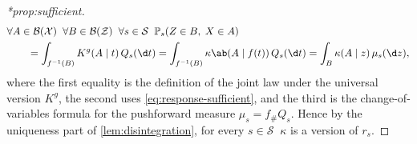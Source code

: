 \documentclass[12pt]{article}
\newcommand{\Prb}{\mathbb{P}}
\newcommand{\Gens}{\mathcal{S}}
\newcommand{\Borel}{\mathcal{B}}
\newcommand{\1}{\mathbbm{1}}
\newcommand{\pushf}[1]{#1_{\#}}
\renewcommand{\[}{\begin{equation}}
\renewcommand{\]}{\end{equation}}
\begin{document}
\begin{proof}[*prop:sufficient]
        \[
            \begin{split}
                &\forall A \in \Borel(\mathcal X) \;\; \forall B \in \Borel (\mathcal Z)\;\;\forall s \in \Gens \;\; \Prb_s(Z\in B,\; X\in A) \\
                &\qquad  = \int_{f^{-1}(B)} K^g(A \mid t)\,Q_s(\d t) = \int_{f^{-1}(B)} \kappa \ab(A\mid f(t)) \, Q_s(\d t) = \int_B \kappa( A \mid z)\,\mu_s(\d z),
            \end{split}
        \]
        where the first equality is the definition of the joint law under the universal version \(K^g\), the second uses \cref{eq:response-sufficient}, and the third is the change-of-variables formula for the pushforward measure \(\mu_s=\pushf fQ_s\).
        Hence by the uniqueness part of \cref{lem:disintegration}, for every \( s \in \Gens \;\; \kappa \) is a version of \(r_s\).
    \end{proof}
\end{document}
